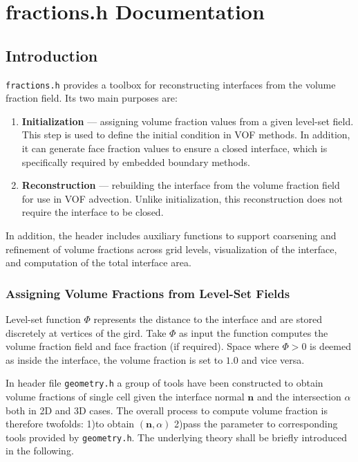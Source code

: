 \chapter{fractions.h Documentation}
\ifsingle
\maketitle
\fi
\chaptermeta[draft][2025-09-10]
\section{Introduction}\label{sec:intro}
\texttt{fractions.h} provides a toolbox for reconstructing interfaces from the
volume fraction field. Its two main purposes are:

\begin{enumerate}
  \item \textbf{Initialization} --- assigning volume fraction values from a given
  level-set field. This step is used to define the initial condition in VOF
  methods. In addition, it can generate face fraction values to ensure a closed
  interface, which is specifically required by embedded boundary methods.
  \item \textbf{Reconstruction} --- rebuilding the interface from the volume
  fraction field for use in VOF advection. Unlike initialization, this
  reconstruction does not require the interface to be closed.
\end{enumerate}

In addition, the header includes auxiliary functions to support coarsening and refinement of volume fractions across grid levels, visualization of the interface, and computation of the total interface area.

\subsection{Assigning Volume Fractions from Level-Set Fields}\label{sec:fractions-init}  

Level-set function $\Phi$ represents the distance to the interface and are stored discretely at vertices of the gird. Take $\Phi$ as input the function  computes the volume fraction field and face fraction (if required). Space where $\Phi>0$ is deemed as inside the interface, the volume fraction is set to $1.0$ and vice versa.

In header file \texttt{geometry.h} a group of tools have been constructed to obtain volume fractions of single cell given the interface normal $\mathbf{n}$ and the intersection $\alpha$ both in 2D and 3D cases. The overall process to compute volume fraction is therefore twofolds: 1)to obtain $(\mathbf{n}, \alpha)$ 2)pass the parameter to corresponding tools provided by \texttt{geometry.h}. The underlying theory shall be briefly introduced in the following.

